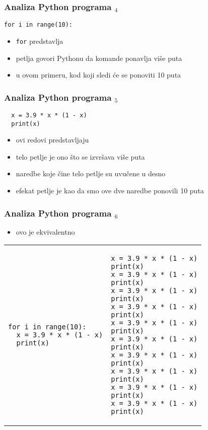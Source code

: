 \documentclass[utf8,compress]{beamer}
\begin{document}
\begin{frame}[fragile]
\frametitle{Analiza Python programa $_4$}
\begin{verbatim}
for i in range(10):
\end{verbatim}
\begin{itemize}
  \item \texttt{for} predstavlja 
  \item petlja govori Pythonu da komande ponavlja više puta
  \item u ovom primeru, kod koji sledi će se ponoviti 10 puta
\end{itemize}
\end{frame}

\begin{frame}[fragile]
\frametitle{Analiza Python programa $_5$}
\begin{verbatim}
  x = 3.9 * x * (1 - x)
  print(x)
\end{verbatim}
\begin{itemize}
  \item ovi redovi predstavljaju 
  \item telo petlje je ono što se izvršava više puta
  \item naredbe koje čine telo petlje su uvučene u desno
  \item efekat petlje je kao da smo ove dve naredbe ponovili 10 puta
\end{itemize}
\end{frame}

\begin{frame}[fragile,shrink=30]
\frametitle{Analiza Python programa $_6$}
\begin{itemize}
  \item ovo je ekvivalentno
\end{itemize}
\begin{tabular}{|p{5cm}|p{5cm}|}
\begin{verbatim}
for i in range(10):
  x = 3.9 * x * (1 - x)
  print(x)
\end{verbatim}
&
\begin{verbatim}
x = 3.9 * x * (1 - x)
print(x)
x = 3.9 * x * (1 - x)
print(x)
x = 3.9 * x * (1 - x)
print(x)
x = 3.9 * x * (1 - x)
print(x)
x = 3.9 * x * (1 - x)
print(x)
x = 3.9 * x * (1 - x)
print(x)
x = 3.9 * x * (1 - x)
print(x)
x = 3.9 * x * (1 - x)
print(x)
x = 3.9 * x * (1 - x)
print(x)
x = 3.9 * x * (1 - x)
print(x)
\end{verbatim}
\end{tabular}
\end{frame}
\end{document}
